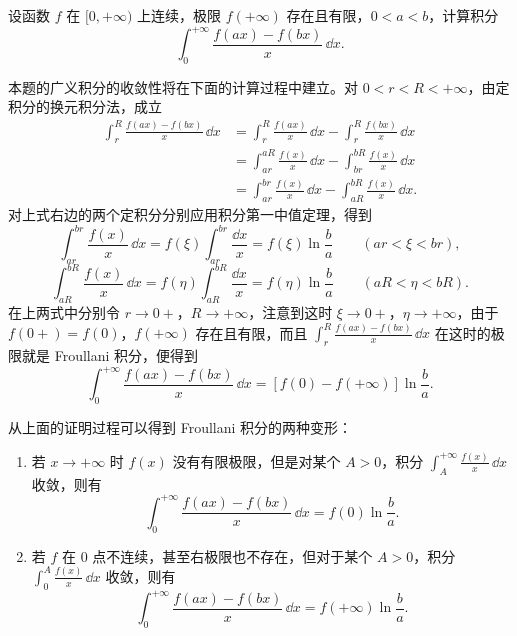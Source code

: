 \begin{xexample}
设函数 $f$ 在 $[0,+\infty)$ 上连续，极限 $f(+\infty)$ 存在且有限，$0<a<b$，计算积分
\[
  \int_0^{+\infty}\frac{f(ax)-f(bx)}x\,\dd x.
\]
\end{xexample}
\begin{xsolution}
本题的广义积分的收敛性将在下面的计算过程中建立。对 $0<r<R<+\infty$，由定积分的换元积分法，成立
\begin{align*}
  \int_r^R\frac{f(ax)-f(bx)}x\,\dd x
  &=\int_r^R\frac{f(ax)}x\,\dd x-\int_r^R\frac{f(bx)}x\,\dd x\\
  &=\int_{ar}^{aR}\frac{f(x)}x\,\dd x-\int_{br}^{bR}\frac{f(x)}x\,\dd x\\
  &=\int_{ar}^{br}\frac{f(x)}x\,\dd x-\int_{aR}^{bR}\frac{f(x)}x\,\dd x.
\end{align*}
对上式右边的两个定积分分别应用积分第一中值定理，得到
\[
  \int_{ar}^{br}\frac{f(x)}x\,\dd x
  =f(\xi)\int_{ar}^{br}\frac{\dd x}x
  =f(\xi)\ln\frac ba\qquad(ar<\xi<br),
\]
\[
  \int_{aR}^{bR}\frac{f(x)}x\,\dd x
  =f(\eta)\int_{aR}^{bR}\frac{\dd x}x
  =f(\eta)\ln\frac ba\qquad(aR<\eta<bR).
\]
在上两式中分别令 $r\to0+$，$R\to+\infty$，注意到这时 $\xi\to0+$，$\eta\to+\infty$，由于 $f(0+)=f(0)$，$f(+\infty)$ 存在且有限，而且 $\int_r^R\frac{f(ax)-f(bx)}x\,\dd x$ 在这时的极限就是 Froullani 积分，便得到
\[
  \int_0^{+\infty}\frac{f(ax)-f(bx)}x\,\dd x
  =[f(0)-f(+\infty)]\ln\frac ba.
\]
\end{xsolution}

\begin{xremark}
从上面的证明过程可以得到 Froullani 积分的两种变形：
\begin{enumerate}[label=(\arabic*)]
  \item 若 $x\to+\infty$ 时 $f(x)$ 没有有限极限，但是对某个 $A>0$，积分 $\int_A^{+\infty}\frac{f(x)}x\,\dd x$ 收敛，则有
  \[
    \int_0^{+\infty}\frac{f(ax)-f(bx)}x\,\dd x=f(0)\ln\frac ba.
  \]
  \item 若 $f$ 在 0 点不连续，甚至右极限也不存在，但对于某个 $A>0$，积分 $\int_0^A\frac{f(x)}x\,\dd x$ 收敛，则有
  \[
    \int_0^{+\infty}\frac{f(ax)-f(bx)}x\,\dd x=f(+\infty)\ln\frac ba.
  \]
\end{enumerate}
\end{xremark}

